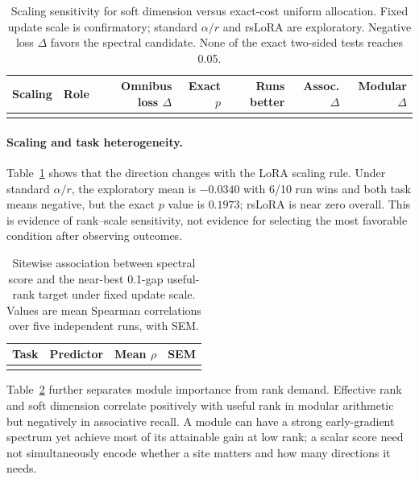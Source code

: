 \documentclass[10pt,twocolumn]{article}
\theoremstyle{definition}
\begin{document}
\begin{table}[t]
\centering
\small
\caption{Scaling sensitivity for soft dimension versus exact-cost uniform allocation.  Fixed update scale is confirmatory; standard $\alpha/r$ and rsLoRA are exploratory.  Negative loss $\Delta$ favors the spectral candidate.  None of the exact two-sided tests reaches 0.05.}
\label{tab:transformer-scaling}
\begin{tabular}{llrrrrr}
\toprule
Scaling & Role & Omnibus loss $\Delta$ & Exact $p$ & Runs better & Assoc. $\Delta$ & Modular $\Delta$ \\
\midrule
\\
\bottomrule
\end{tabular}
\end{table}

\paragraph{Scaling and task heterogeneity.}
Table~\ref{tab:transformer-scaling} shows that the direction changes with the LoRA scaling rule.  Under standard $\alpha/r$, the exploratory mean is $-0.0340$ with 6/10 run wins and both task means negative, but the exact $p$ value is $0.1973$; rsLoRA is near zero overall.  This is evidence of rank--scale sensitivity, not evidence for selecting the most favorable condition after observing outcomes.

\begin{table}[H]
\centering
\small
\caption{Sitewise association between spectral score and the near-best 0.1-gap useful-rank target under fixed update scale.  Values are mean Spearman correlations over five independent runs, with SEM.}
\label{tab:transformer-sitewise}
\begin{tabular}{llrr}
\toprule
Task & Predictor & Mean $\rho$ & SEM \\
\midrule
\\
\bottomrule
\end{tabular}
\end{table}

Table~\ref{tab:transformer-sitewise} further separates module importance from rank demand.  Effective rank and soft dimension correlate positively with useful rank in modular arithmetic but negatively in associative recall.  A module can have a strong early-gradient spectrum yet achieve most of its attainable gain at low rank; a scalar score need not simultaneously encode whether a site matters and how many directions it needs.
\end{document}
